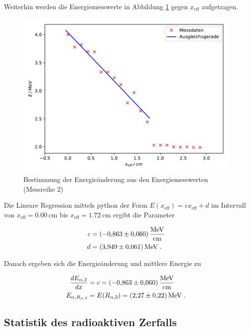     Weiterhin werden die Energiemesswerte in Abbildung \ref{fig:plot4} gegen $x_\text{eff}$ aufgetragen.
    
    \begin{figure} [H]
      \centering
      \includegraphics[scale=0.8]{content/plot4.pdf}
      \caption{Bestimmung der Energieänderung aus den Energiemesswerten (Messreihe 2)}
      \label{fig:plot4}
    \end{figure}
    
    Die Lineare Regression mittels python der Form $E(x_\text{eff}) = c x_\text{eff} + d$ im Intervall
    von $x_\text{eff} = \SI{0.00}{\centi\meter}$ bis $x_\text{eff} = \SI{1.72}{\centi\meter}$
    ergibt die Parameter
    
    \begin{align*}
      c &= \SI{- 0.863 +- 0.060}{\mega \eV \per \centi \meter} \\
      d &= \SI{3.949 +- 0.061}{\mega\eV} \; .
    \end{align*}
    
    Danach ergeben sich die Energieänderung und mittlere Energie zu
    
    \begin{align*}
      \frac{dE_{\alpha, 2}}{dx} &= c = \SI{-0.863 +- 0.060}{\mega \eV \per \centi \meter} \\
      E_{\alpha, R_{\alpha, 2}} &= E(R_{\alpha, 2}) = \SI{2.27 +- 0.22}{\mega\eV} \; .
    \end{align*}


   \subsection{Statistik des radioaktiven Zerfalls} %

